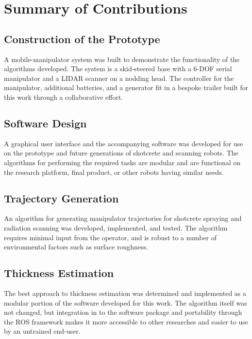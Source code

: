 \section{Summary of Contributions}
\label{sec:contributions}

\subsection{Construction of the Prototype}
A mobile-manipulator system was built to demonstrate the functionality of the algorithms developed. The system is a skid-steered base with a 6-DOF serial manipulator and a LIDAR scanner on a nodding head. The controller for the manipulator, additional batteries, and a generator fit in a bespoke trailer built for this work through a collaborative effort.\\

\subsection{Software Design}
A graphical user interface and the accompanying software was developed for use on the prototype and future generations of shotcrete and scanning robots. The algorithms for performing the required tasks are modular and are functional on the research platform, final product, or other robots having similar needs.\\

\subsection{Trajectory Generation}
An algorithm for generating manipulator trajectories for shotcrete spraying and radiation scanning was developed, implemented, and tested. The algorithm requires minimal input from the operator, and is robust to a number of environmental factors such as surface roughness.\\

\subsection{Thickness Estimation}
The best approach to thickness estimation was determined and implemented as a modular portion of the software developed for this work. The algorithm itself was not changed, but integration in to the software package and portability through the ROS framework makes it more accessible to other researches and easier to use by an untrained end-user.\\


